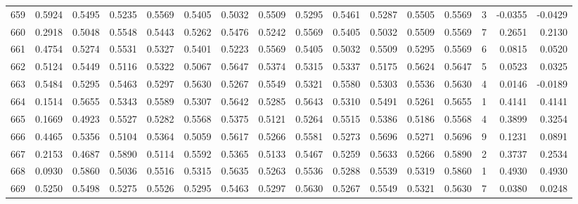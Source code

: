 \begin{tabular}{lrrrrrrrrrrrrrrr}
659 &      0.5924 &  0.5495 &  0.5235 &  0.5569 &  0.5405 &  0.5032 &  0.5509 &  0.5295 &  0.5461 &  0.5287 &   0.5505 &     0.5569 &      3 &                   -0.0355 &                    -0.0429 \\
660 &      0.2918 &  0.5048 &  0.5548 &  0.5443 &  0.5262 &  0.5476 &  0.5242 &  0.5569 &  0.5405 &  0.5032 &   0.5509 &     0.5569 &      7 &                    0.2651 &                     0.2130 \\
661 &      0.4754 &  0.5274 &  0.5531 &  0.5327 &  0.5401 &  0.5223 &  0.5569 &  0.5405 &  0.5032 &  0.5509 &   0.5295 &     0.5569 &      6 &                    0.0815 &                     0.0520 \\
662 &      0.5124 &  0.5449 &  0.5116 &  0.5322 &  0.5067 &  0.5647 &  0.5374 &  0.5315 &  0.5337 &  0.5175 &   0.5624 &     0.5647 &      5 &                    0.0523 &                     0.0325 \\
663 &      0.5484 &  0.5295 &  0.5463 &  0.5297 &  0.5630 &  0.5267 &  0.5549 &  0.5321 &  0.5580 &  0.5303 &   0.5536 &     0.5630 &      4 &                    0.0146 &                    -0.0189 \\
664 &      0.1514 &  0.5655 &  0.5343 &  0.5589 &  0.5307 &  0.5642 &  0.5285 &  0.5643 &  0.5310 &  0.5491 &   0.5261 &     0.5655 &      1 &                    0.4141 &                     0.4141 \\
665 &      0.1669 &  0.4923 &  0.5527 &  0.5282 &  0.5568 &  0.5375 &  0.5121 &  0.5264 &  0.5515 &  0.5386 &   0.5186 &     0.5568 &      4 &                    0.3899 &                     0.3254 \\
666 &      0.4465 &  0.5356 &  0.5104 &  0.5364 &  0.5059 &  0.5617 &  0.5266 &  0.5581 &  0.5273 &  0.5696 &   0.5271 &     0.5696 &      9 &                    0.1231 &                     0.0891 \\
667 &      0.2153 &  0.4687 &  0.5890 &  0.5114 &  0.5592 &  0.5365 &  0.5133 &  0.5467 &  0.5259 &  0.5633 &   0.5266 &     0.5890 &      2 &                    0.3737 &                     0.2534 \\
668 &      0.0930 &  0.5860 &  0.5036 &  0.5516 &  0.5315 &  0.5635 &  0.5263 &  0.5536 &  0.5288 &  0.5539 &   0.5319 &     0.5860 &      1 &                    0.4930 &                     0.4930 \\
669 &      0.5250 &  0.5498 &  0.5275 &  0.5526 &  0.5295 &  0.5463 &  0.5297 &  0.5630 &  0.5267 &  0.5549 &   0.5321 &     0.5630 &      7 &                    0.0380 &                     0.0248 \\

\end{tabular}
